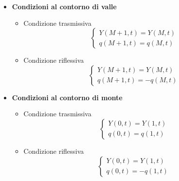 \documentclass[12pt]{article} %
\begin{document}
\begin{itemize}
\item\textbf{Condizioni al contorno di valle}
\begin{itemize}
    \item Condizione trasmissiva
    \begin{equation}
        \begin{cases}
        Y(M+1,t)=Y(M,t)\\
        q(M+1,t)=q(M,t)
        \end{cases}
    \end{equation}
    \item Condizione riflessiva
    \begin{equation}
        \begin{cases}
        Y(M+1,t)=Y(M,t)\\
        q(M+1,t)=-q(M,t)
        \end{cases}
    \end{equation}
\end{itemize}
\item\textbf{Condizioni al contorno di monte}
\begin{itemize}
    \item Condizione trasmissiva
    \begin{equation}
        \begin{cases}
        Y(0,t)=Y(1,t)\\
        q(0,t)=q(1,t)
        \end{cases}
\end{equation}
    \item Condizione riflessiva
    \begin{equation}
        \begin{cases}
        Y(0,t)=Y(1,t)\\
        q(0,t)=-q(1,t)
        \end{cases}
    \end{equation}
\end{itemize}
\end{itemize}
\end{document}
